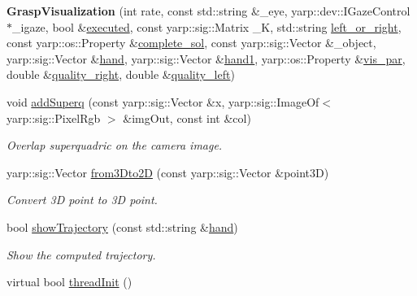 \begin{DoxyCompactItemize}
\item 
{\bfseries Grasp\+Visualization} (int rate, const std\+::string \&\+\_\+eye, yarp\+::dev\+::\+I\+Gaze\+Control $\ast$\+\_\+igaze, bool \&\hyperlink{classGraspVisualization_ac1c748f2c0bbb38c4ea19216cb4dbfc8}{executed}, const yarp\+::sig\+::\+Matrix \+\_\+K, std\+::string \hyperlink{classGraspVisualization_ac960abe59ca5c92521d9cb9f01dc6370}{left\+\_\+or\+\_\+right}, const yarp\+::os\+::\+Property \&\hyperlink{classGraspVisualization_a542f3bc536b354d12256f2c95fcadab1}{complete\+\_\+sol}, const yarp\+::sig\+::\+Vector \&\+\_\+object, yarp\+::sig\+::\+Vector \&\hyperlink{classGraspVisualization_af6ecf326ddb626e2dd7f83e8d75d12eb}{hand}, yarp\+::sig\+::\+Vector \&\hyperlink{classGraspVisualization_a23c0f2f9e30b20ff6ec38e0fe119ab39}{hand1}, yarp\+::os\+::\+Property \&\hyperlink{classGraspVisualization_a0efcb3e2545e09b7480da109ceaa4533}{vis\+\_\+par}, double \&\hyperlink{classGraspVisualization_aa82104f77a9903438727132275401f96}{quality\+\_\+right}, double \&\hyperlink{classGraspVisualization_a773050ce006cffa999ffc3aeea671752}{quality\+\_\+left})\label{classGraspVisualization_a33db96015b6d831cbd12d3c2279ec161}

\item 
void \hyperlink{classGraspVisualization_a0069fc0b6752a254d09d5f5f7f72dba8}{add\+Superq} (const yarp\+::sig\+::\+Vector \&x, yarp\+::sig\+::\+Image\+Of$<$ yarp\+::sig\+::\+Pixel\+Rgb $>$ \&img\+Out, const int \&col)
\begin{DoxyCompactList}\small\item\em Overlap superquadric on the camera image. \end{DoxyCompactList}\item 
yarp\+::sig\+::\+Vector \hyperlink{classGraspVisualization_a7217275a38ec798541bd68a84618bda6}{from3\+Dto2D} (const yarp\+::sig\+::\+Vector \&point3D)
\begin{DoxyCompactList}\small\item\em Convert 3D point to 3D point. \end{DoxyCompactList}\item 
bool \hyperlink{classGraspVisualization_a3ada3605a942fb51696e9747fed52a72}{show\+Trajectory} (const std\+::string \&\hyperlink{classGraspVisualization_af6ecf326ddb626e2dd7f83e8d75d12eb}{hand})
\begin{DoxyCompactList}\small\item\em Show the computed trajectory. \end{DoxyCompactList}\item 
virtual bool \hyperlink{classGraspVisualization_a277232b1b99ecc061242abee8175ff16}{thread\+Init} ()\label{classGraspVisualization_a277232b1b99ecc061242abee8175ff16}


\end{DoxyCompactItemize}
